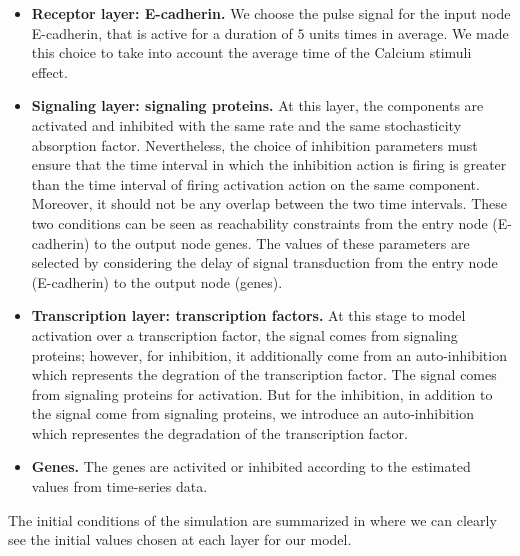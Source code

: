 \begin{itemize}
 \item \textbf{Receptor layer: E-cadherin.} We choose the  pulse signal for the input node E-cadherin, that is active for a duration of $5$ units times in average. We made this 
 choice to take into account the average time of the Calcium stimuli effect.
 \item \textbf{Signaling layer: signaling proteins.} At this layer, the components are activated and inhibited with the same rate and the same stochasticity absorption factor. 
 Nevertheless, the choice of inhibition parameters must ensure that the time interval in which the inhibition action 
 is firing is greater than the time interval of firing activation action on the same component. Moreover, it should not be any overlap between the two time intervals. These two conditions
 can be seen as reachability constraints from the entry  node (E-cadherin) to the output node genes. The values of these parameters are selected by considering the delay of signal transduction from the entry
 node (E-cadherin) to the output node (genes).
 \item \textbf{Transcription layer: transcription factors.} At this stage to model activation over a transcription factor, the signal comes from signaling proteins; however, for inhibition, it additionally 
 come from an auto-inhibition which represents the degration of the transcription factor. The signal comes from signaling proteins for activation. But for the inhibition, in addition 
 to the signal come from signaling proteins, we introduce an auto-inhibition which representes the degradation of the transcription factor.
 \item \textbf{Genes.} The genes are activited or inhibited according to the estimated values from time-series data.
\end{itemize}

The initial conditions of the simulation are summarized in  where we can clearly see the initial values chosen at each layer for our model.

